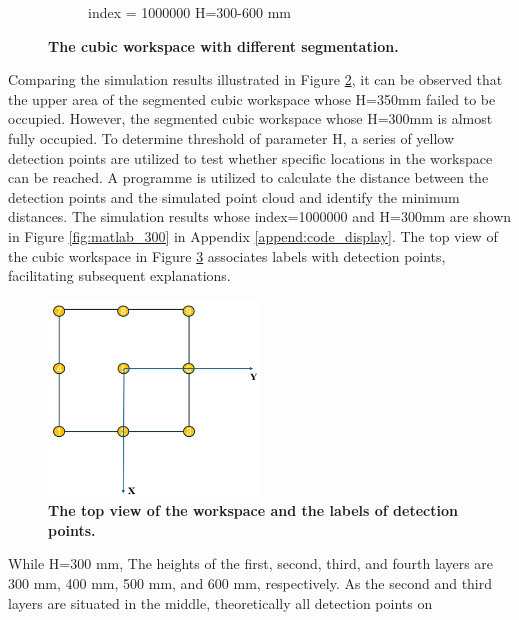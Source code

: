 \begin{figure}[H]
\begin{subfigure}{0.45\textwidth}
        \caption{\centering index = 1000000 H=300-600 mm}
        \label{fig:ws_10000_300}
    \end{subfigure}
    \caption[The cubic workspace with different segmentation]
    {\centering \textbf{The cubic workspace with different segmentation.}}
    \label{fig:ws_300_350}
\end{figure}
\vspace{-5mm}
Comparing the simulation results illustrated in Figure \ref{fig:ws_300_350}, it can be observed that the upper 
area of the segmented cubic workspace whose H=350mm failed to be occupied. However, the segmented cubic workspace 
whose H=300mm is almost fully occupied. To determine threshold of parameter H, a series of yellow detection points 
are utilized to test whether specific locations in the workspace can be reached. A programme is utilized to calculate 
the distance between the detection points and the simulated point cloud and identify the minimum distances. The  
simulation results whose index=1000000 and H=300mm are shown in Figure \ref{fig:matlab_300} in Appendix 
\ref{append:code_display}. The top view of the cubic workspace in Figure \ref{fig:top_view} associates labels with 
detection points, facilitating subsequent explanations. 
\begin{figure}[H] %
    \centering 
    \captionsetup{labelsep=colon}
    \includegraphics[width=0.5\textwidth]{Image/Result/top_view_rect_workspace.png} 
    \caption[The top view of the workspace and the labels of detection points]
    {\centering \textbf{The top view of the workspace and the labels of detection points.}}
    \label{fig:top_view}
\end{figure}
\vspace{-5mm}
While H=300 mm, The heights of the first, second, third, and fourth layers are 300 mm, 400 mm, 500 mm, and 600 mm, 
respectively. As the second and third layers are situated in the middle, theoretically all detection points on 
